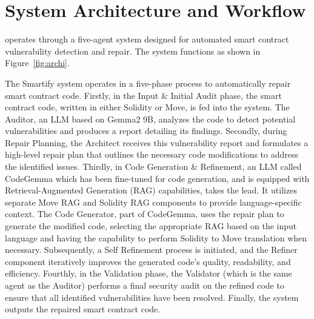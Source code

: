 \section{\sln{} System Architecture and Workflow}

\sln{} operates through a five-agent system designed for automated smart contract vulnerability detection and repair. The system functions as shown in Figure~\ref{fig:archi}.

The Smartify system operates in a five-phase process to automatically repair smart contract code.  Firstly, in the Input \& Initial Audit phase, the smart contract code, written in either Solidity or Move, is fed into the system. The Auditor, an LLM based on Gemma2 9B, analyzes the code to detect potential vulnerabilities and produces a report detailing its findings.  Secondly, during Repair Planning, the Architect receives this vulnerability report and formulates a high-level repair plan that outlines the necessary code modifications to address the identified issues. Thirdly, in Code Generation \& Refinement, an LLM called CodeGemma which has been fine-tuned for code generation, and is equipped with Retrieval-Augmented Generation (RAG) capabilities, takes the lead. It utilizes separate Move RAG and Solidity RAG components to provide language-specific context. The Code Generator, part of CodeGemma, uses the repair plan to generate the modified code, selecting the appropriate RAG based on the input language and having the capability to perform Solidity to Move translation when necessary. Subsequently, a Self Refinement process is initiated, and the Refiner component iteratively improves the generated code's quality, readability, and efficiency.  Fourthly, in the Validation phase, the Validator (which is the same agent as the Auditor) performs a final security audit on the refined code to ensure that all identified vulnerabilities have been resolved. Finally, the system outputs the repaired smart contract code.


    
